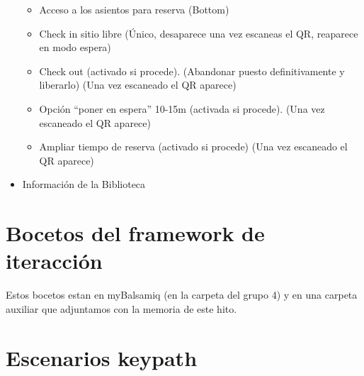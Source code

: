 \documentclass[12pt]{article}
\begin{document}
\begin{itemize}
\begin{itemize}
\begin{itemize}
\begin{itemize}
\begin{itemize}
\end{itemize}
\end{itemize}

\end{itemize}

\item Acceso a los asientos para reserva (Bottom)



\item Check in sitio libre (Único, desaparece una vez escaneas el QR, reaparece en modo espera)

\item Check out (activado si procede). (Abandonar puesto definitivamente y liberarlo) (Una vez escaneado el QR aparece)
\item Opción “poner en espera” 10-15m (activada si procede). (Una vez escaneado el QR aparece)

\item Ampliar tiempo de reserva (activado si procede) (Una vez escaneado el QR aparece)


\end{itemize}

\item Información de la Biblioteca

\end{itemize}





\newpage
\section{Bocetos del framework de iteracción}

Estos bocetos estan en myBalsamiq (en la carpeta del grupo 4) y en una carpeta auxiliar que adjuntamos con la memoria de este hito.

\section{Escenarios keypath}
\end{document}
